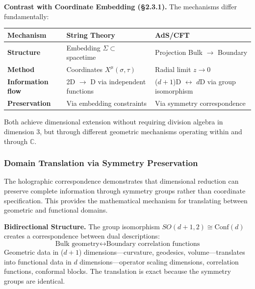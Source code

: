 \textbf{Contrast with Coordinate Embedding (\S 2.3.1).} The mechanisms differ fundamentally:

\begin{table}[h]
    \centering
    \begin{tabular}{lll}
        \hline
        \textbf{Mechanism}        & \textbf{String Theory}               & \textbf{AdS/CFT}                                      \\ \hline
        \textbf{Structure}        & Embedding $\Sigma \subset$ spacetime & Projection Bulk $\to$ Boundary                        \\
        \textbf{Method}           & Coordinates $X^\mu(\sigma,\tau)$     & Radial limit $z \to 0$                                \\
        \textbf{Information flow} & 2D $\to$ D via independent functions & ($d+1$)D $\leftrightarrow$ $d$D via group isomorphism \\
        \textbf{Preservation}     & Via embedding constraints            & Via symmetry correspondence                           \\ \hline
    \end{tabular}
\end{table}

Both achieve dimensional extension without requiring division algebra in dimension 3, but through different geometric mechanisms operating within and through $\mathbb{C}$.

\subsubsection{Domain Translation via Symmetry Preservation}

The holographic correspondence demonstrates that dimensional reduction can preserve complete information through symmetry groups rather than coordinate specification. This provides the mathematical mechanism for translating between geometric and functional domains.

\textbf{Bidirectional Structure.} The group isomorphism $SO(d+1,2) \cong \text{Conf}(d)$ creates a correspondence between dual descriptions:
\[
    \text{Bulk geometry} \longleftrightarrow \text{Boundary correlation functions}
\]
Geometric data in ($d+1$) dimensions—curvature, geodesics, volume—translates into functional data in $d$ dimensions—operator scaling dimensions, correlation functions, conformal blocks. The translation is exact because the symmetry groups are identical.

